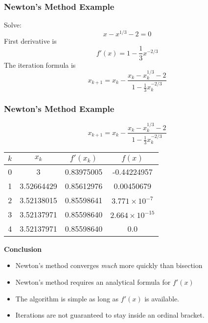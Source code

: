 \documentclass[10pt]{beamer}
\begin{document}
\begin{frame}
\frametitle{Newton's Method Example}

Solve:
\begin{equation*}
    x - x^{1/3} - 2 = 0
\end{equation*}
First derivative is
\begin{equation*}
    f'(x) = 1 - \frac{1}{3}x^{-2/3}
\end{equation*}
The iteration formula is
\begin{equation*}
    x_{k+1} = x_k - \frac{x_k - x_k^{1/3} - 2}{1 - \frac{1}{3}x_k^{-2/3}}
\end{equation*}


\end{frame}
\begin{frame}
\frametitle{Newton's Method Example}


\begin{equation*}
    x_{k+1} = x_k - \frac{x_k - x_k^{1/3} - 2}{1 - \frac{1}{3}x_k^{-2/3}}
\end{equation*}

\vspace{2ex}
\begin{center}
  \small
    \renewcommand{\arraystretch}{1.3}
    \begin{tabular}{cccc}
    $k$ &    $x_k$     & $f'(x_k)$  &   $f(x)$                   \\ \hline
     0  &  3           & 0.83975005 & -0.44224957                \\
     1  &  3.52664429  & 0.85612976 &  0.00450679                \\
     2  &  3.52138015  & 0.85598641 &  $3.771\times 10^{-7}$   \\
     3  &  3.52137971  & 0.85598640 &  $2.664\times 10^{-15}$ \\
     4  &  3.52137971  & 0.85598640 &  0.0                       \\
    \end{tabular}
\end{center}

\vspace{2ex}

\textbf{Conclusion}
\vspace{0.0cm}
\begin{itemize}
    \item   Newton's method converges \emph{much} more quickly than bisection
    \item   Newton's method requires an analytical formula for $f'(x)$
    \item   The algorithm is simple as long as $f'(x)$ is available.
    \item   Iterations are not guaranteed to stay inside an ordinal bracket.
\end{itemize}




\end{frame}
\end{document}
